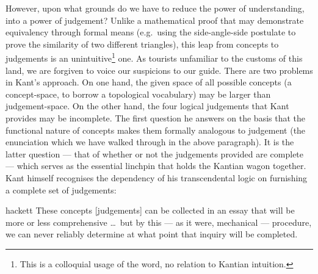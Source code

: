 However, upon what grounds do we have to reduce the power of understanding, into a power of judgement? Unlike a mathematical proof that may demonstrate equivalency through formal means (e.g.\ using the side-angle-side postulate to prove the similarity of two different triangles), this leap from concepts to judgements is an unintuitive\footnote{This is a colloquial usage of the word, no relation to Kantian intuition.} one. As tourists unfamiliar to the customs of this land, we are forgiven to voice our suspicions to our guide. There are two problems in Kant's approach. On one hand, the given space of all possible concepts (a concept-space, to borrow a topological vocabulary) may be larger than judgement-space. On the other hand, the four logical judgements that Kant provides may be incomplete. The first question he answers on the basis that the functional nature of concepts makes them formally analogous to judgement (the enunciation which we have walked through in the above paragraph). It is the latter question --- that of whether or not the judgements provided are complete --- which serves as the essential linchpin that holds the Kantian wagon together. Kant himself recognises the dependency of his transcendental logic on furnishing a complete set of judgements:

\begin{displaycquote}[B92]{hackett}
  These concepts [judgements] can be collected in an essay that will be more or less comprehensive \ldots\ but by this --- as it were, mechanical --- procedure, we can never reliably determine at what point that inquiry will be completed.
\end{displaycquote}

